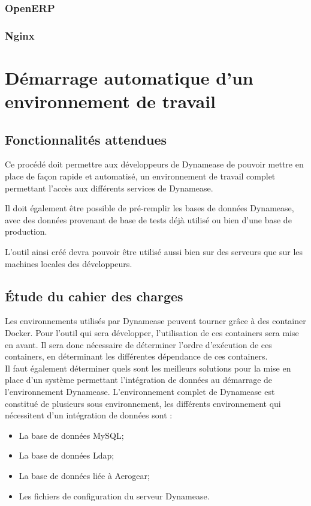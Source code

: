 \subsubsection{OpenERP}

\subsubsection{Nginx}

\section{Démarrage automatique d'un environnement de travail}

\subsection{Fonctionnalités attendues}

Ce procédé doit permettre aux développeurs de Dynamease de pouvoir mettre en place de façon rapide et automatisé, un environnement de travail complet permettant l'accès aux différents services de Dynamease. 

Il doit également être possible de pré-remplir les bases de données Dynamease, avec des données provenant de base de tests déjà utilisé ou bien d'une base de production.

L'outil ainsi créé devra pouvoir être utilisé aussi bien sur des serveurs que sur les machines locales des développeurs. 

\subsection{Étude du cahier des charges}

Les environnements utilisés par Dynamease peuvent tourner grâce à des container Docker. Pour l'outil qui sera développer, l'utilisation de ces containers sera mise en avant. Il sera donc nécessaire de déterminer l'ordre d'exécution de ces containers, en déterminant les différentes dépendance de ces containers.\\

Il faut également déterminer quels sont les meilleurs solutions pour la mise en place d'un système permettant l'intégration de données au démarrage de l'environnement Dynamease. L'environnement complet de Dynamease est constitué de plusieurs sous environnement, les différents environnement qui nécessitent d'un intégration de données sont :

\begin{itemize}
	\item La base de données MySQL;
	\item La base de données Ldap;
	\item La base de données liée à Aerogear;
	\item Les fichiers de configuration du serveur Dynamease.
\end{itemize}

